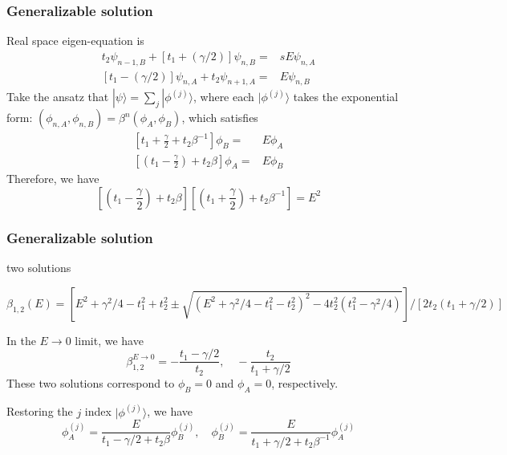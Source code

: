 \documentclass{beamer}
\begin{document}
  \begin{frame}
    \frametitle{Generalizable solution}
    Real space eigen-equation is 
    \begin{equation}
    \begin{aligned}
    t_2\psi_{n-1,B}+\left[t_1+(\gamma/2)\right]\psi_{n,B}=&sE\psi_{n,A}\\
    \left[t_1-(\gamma/2)\right]\psi_{n,A}+t_2\psi_{n+1,A}=&E\psi_{n,B}
    \end{aligned}
    \end{equation}
    Take the ansatz that $|\psi\rangle=\sum_j|\phi^{(j)}\rangle$, where each $|\phi^{(j)}\rangle$ takes the exponential form: $(\phi_{n,A},\phi_{n,B})=\beta^n(\phi_A,\phi_B)$, which satisfies
    \begin{equation}
    \begin{aligned}
    \left[t_1+\frac{\gamma}{2}+t_2\beta^{-1}\right]\phi_B=&E\phi_A\\
    \left[(t_1-\frac{\gamma}{2})+t_2\beta\right]\phi_A=&E\phi_B
    \end{aligned}
    \end{equation}
    Therefore, we have
    \begin{equation}
    \left[(t_1-\frac{\gamma}{2})+t_2\beta\right]\left[(t_1+\frac{\gamma}{2})+t_2\beta^{-1}\right]=E^2\label{2ndeq}
    \end{equation}
  \end{frame}
  \begin{frame}
  \frametitle{Generalizable solution}
  two solutions
  \begin{scriptsize}
 \begin{equation}
 \beta_{1,2}(E)=\left[E^2+\gamma^2/4-t_1^2+t_2^2\pm\sqrt{(E^2+\gamma^2/4-t_1^2-t_2^2)^2-4t_2^2(t_1^2-\gamma^2/4)}\right]/\left[2t_2(t_1+\gamma/2)\right]
 \end{equation}
  \end{scriptsize}
  In the $E\rightarrow 0$ limit, we have
  \begin{equation}
  \beta_{1,2}^{E\rightarrow 0}=-\frac{t_1-\gamma/2}{t_2},\quad -\frac{t_2}{t_1+\gamma/2}
  \end{equation}
  These two solutions correspond to $\phi_B=0$ and $\phi_A=0$, respectively.
  
  Restoring the $j$ index $|\phi^{(j)}\rangle$, we have
  \begin{equation}
  \phi_A^{(j)}=\frac{E}{t_1-\gamma/2+t_2\beta}\phi_B^{(j)},\quad \phi_B^{(j)}=\frac{E}{t_1+\gamma/2+t_2\beta^{-1}}\phi_A^{(j)}\label{jd}
  \end{equation}
\end{frame}
  
\end{document}
